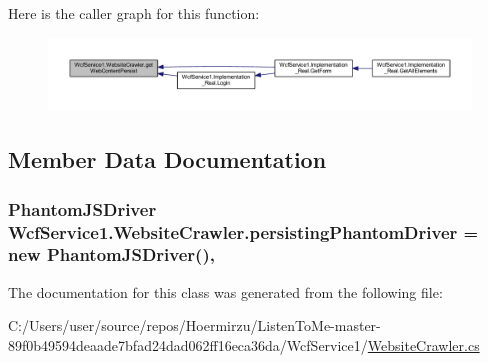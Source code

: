 Here is the caller graph for this function\+:\nopagebreak
\begin{figure}[H]
\begin{center}
\leavevmode
\includegraphics[width=350pt]{class_wcf_service1_1_1_website_crawler_afb8f0be0431c8622a8071d8ee088601e_icgraph}
\end{center}
\end{figure}




\subsection{Member Data Documentation}
\subsubsection[{\texorpdfstring{persisting\+Phantom\+Driver}{persistingPhantomDriver}}]{\setlength{\rightskip}{0pt plus 5cm}Phantom\+J\+S\+Driver Wcf\+Service1.\+Website\+Crawler.\+persisting\+Phantom\+Driver = new Phantom\+J\+S\+Driver()\hspace{0.3cm}{\ttfamily [static]}, {\ttfamily [private]}}\hypertarget{class_wcf_service1_1_1_website_crawler_a19b2a7a21595cee4f8a9317add3bc0b0}{}\label{class_wcf_service1_1_1_website_crawler_a19b2a7a21595cee4f8a9317add3bc0b0}


The documentation for this class was generated from the following file\+:\begin{DoxyCompactItemize}
\item 
C\+:/\+Users/user/source/repos/\+Hoermirzu/\+Listen\+To\+Me-\/master-\/89f0b49594deaade7bfad24dad062ff16eca36da/\+Wcf\+Service1/\hyperlink{_website_crawler_8cs}{Website\+Crawler.\+cs}\end{DoxyCompactItemize}
